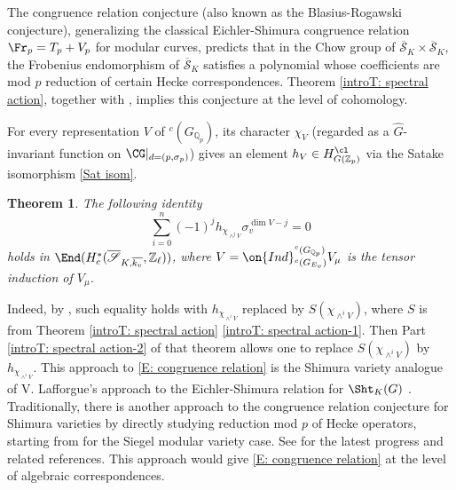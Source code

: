 \documentclass[11pt]{amsart}
\newtheorem{thm}{Theorem}[subsection]
\theoremstyle{definition}
\theoremstyle{definition}
\theoremstyle{definition}
\numberwithin{equation}{section}
\newcommand{\bQ}{{\mathbb Q}}
\newcommand{\bZ}{{\mathbb Z}}
\newcommand{\scrS}{{\mathscr S}}
\begin{document}
The congruence relation conjecture (also known as the Blasius-Rogawski conjecture), generalizing the classical Eichler-Shimura congruence relation $\Fr_p=T_p+V_p$ for modular curves,  predicts that in the Chow group of $\overline{\scrS}_K\times \overline{\scrS}_K$, the Frobenius endomorphism of $\overline{\scrS}_K$ satisfies a polynomial whose coefficients are mod $p$ reduction of certain Hecke correspondences. 
Theorem \ref{introT: spectral action}, together with \cite[Sect. 6.3]{Xiao-Zhu-Invariants}, implies this conjecture at the level of cohomology.

For every representation $V$ of ${}^c(G_{\bQ_p})$, its character $\chi_V$ (regarded as a $\hat{G}$-invariant function on $\CG|_{d=(p,\sigma_p)}$) gives an element $h_V\in H_{G(\bZ_p)}^{\cl}$ via the Satake isomorphism \eqref{Sat isom}.

\begin{thm}
The following identity 
\begin{equation}\label{E: congruence relation} 
\sum_{i=0}^{n}(-1)^j h_{\chi_{\wedge ^j V}} \sigma_v^{\dim V-j}=0
\end{equation}
holds in $\End (H^*_c(\overline{\scrS}_{K ,\overline{k_v}},\bZ_\ell))$, where $V=\on{Ind}_{{}^c(G_{E_v})}^{{}^c(G_{\bQ_p})}V_\mu$ is the tensor induction of $V_\mu$.
\end{thm}

Indeed, by \cite[Sect. 6.3]{Xiao-Zhu-Invariants}, such equality holds with $h_{\chi_{\wedge ^i V}}$ replaced by $S(\chi_{\wedge ^i V})$, where $S$ is from Theorem \ref{introT: spectral action} \eqref{introT: spectral action-1}. Then Part \eqref{introT: spectral action-2} of that theorem allows one to replace $S(\chi_{\wedge ^i V})$ by $h_{\chi_{\wedge ^i V}}$.  This approach to \eqref{E: congruence relation} is the Shimura variety analogue of V. Lafforgue's approach to the Eichler-Shimura relation for $\Sht_K(G)$ \cite{Lafforgue-Automorphic-to-Galois}. Traditionally, there is another approach to the congruence relation conjecture for Shimura varieties by directly studying reduction mod $p$ of Hecke operators, starting from \cite{Faltings-Chai-Abelian} for the Siegel modular variety case. See \cite{Lee-ES-Relation} for the latest progress and related references. This approach would give \eqref{E: congruence relation}  at the level of algebraic correspondences.
\end{document}
